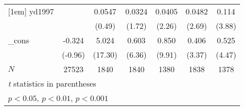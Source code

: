 \begin{table}[htbp]
\begin{tabular}{l*{6}{c}}
[1em]
yd1997      &                     &      0.0547         &      0.0324         &      0.0405\sym{*}  &      0.0482\sym{**} &       0.114\sym{***}\\
            &                     &      (0.49)         &      (1.72)         &      (2.26)         &      (2.69)         &      (3.88)         \\
[1em]
\_cons      &      -0.324         &       5.024\sym{***}&       0.603\sym{***}&       0.850\sym{***}&       0.406\sym{***}&       0.525\sym{***}\\
            &     (-0.96)         &     (17.30)         &      (6.36)         &      (9.91)         &      (3.37)         &      (4.47)         \\
\hline
\(N\)       &       27523         &        1840         &        1840         &        1380         &        1838         &        1378         \\
\hline\hline
\multicolumn{7}{l}{\footnotesize \textit{t} statistics in parentheses}\\
\multicolumn{7}{l}{\footnotesize \sym{*} \(p<0.05\), \sym{**} \(p<0.01\), \sym{***} \(p<0.001\)}\\
\end{tabular}
\end{table}
